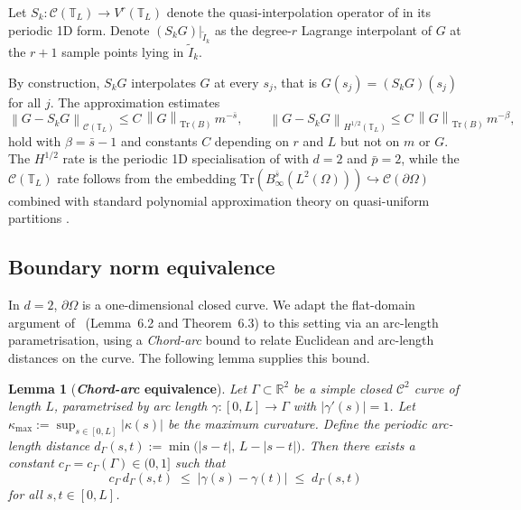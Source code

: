 \documentclass[11pt]{article}
\newtheorem{lemma}[theorem]{Lemma}
\newcommand{\Omg}{\Omega}
\newcommand{\bOmg}{\partial\Omega}
\newcommand{\C}{\mathcal{C}}
\newcommand{\norm}[1]{\left\|#1\right\|}
\newcommand{\R}{\mathbb{R}}
\begin{document}
Let $S_k\colon \C(\mathbb{T}_L) \to V^r(\mathbb{T}_L)$ denote the
quasi-interpolation operator of \cite[\S6.2]{bonito2025} in its
periodic 1D form.  Denote $(S_k G)\big|_{\tilde{I}_k}$ as the degree-$r$
Lagrange interpolant of $G$ at the $r+1$ sample points lying in
$\tilde{I}_k$. 

By construction, $S_k G$ interpolates $G$ at every
$s_j$, that is $G(s_j) = (S_k G)(s_j)$ for all $j$. The approximation
estimates
\begin{equation}\label{eq:quasi_interp}
  \norm{G - S_k G}_{\C(\mathbb{T}_L)}
    \le C\,\norm{G}_{\mathrm{Tr}(B)}\,m^{-\bar{s}},
  \qquad
  \norm{G - S_k G}_{H^{1/2}(\mathbb{T}_L)}
    \le C\,\norm{G}_{\mathrm{Tr}(B)}\,m^{-\beta},
\end{equation}
hold with $\beta = \bar{s} - 1$ and constants $C$ depending on $r$
and $L$ but not on $m$ or $G$. The $H^{1/2}$ rate is the periodic 1D
specialisation of \cite[Theorem~3.2 and~\S A.6.2]{bonito2025} with
$d = 2$ and $\bar{p} = 2$, while the $\C(\mathbb{T}_L)$ rate follows
from the embedding $\mathrm{Tr}(B^{\bar{s}}_\infty(L^2(\Omg)))
\hookrightarrow \C(\partial\Omg)$ combined with standard polynomial
approximation theory on quasi-uniform partitions
\cite{devore1993besov,BrennerScott2008}.

\subsection{Boundary norm equivalence}\label{sec:norm_equiv}

In $d=2$, $\bOmg$ is a one-dimensional closed curve. We adapt the
flat-domain argument of~\cite{bonito2025} (Lemma~6.2 and
Theorem~6.3) to this setting via an arc-length parametrisation,
using a \textit{Chord-arc} bound to relate Euclidean and arc-length
distances on the curve. The following lemma supplies this bound.




\begin{lemma}[\textbf{\textit{Chord-arc} equivalence}]\label{lem:chord_arc}
Let $\Gamma \subset \R^2$ be a simple closed $\C^2$ curve of length $L$,
parametrised by arc length $\gamma\colon [0,L] \to \Gamma$ with
$|\gamma'(s)|=1$. Let $\kappa_{\max} :=
\sup_{s\in[0,L]}|\kappa(s)|$ be the maximum curvature. Define the
periodic arc-length distance $d_\Gamma(s,t) :=
\min\bigl(|s-t|,\,L-|s-t|\bigr)$. Then there exists a constant
$c_\Gamma = c_\Gamma(\Gamma) \in (0,1]$ such that
\begin{equation}\label{eq:chord_arc}
  c_\Gamma\, d_\Gamma(s,t)
  \;\leq\; |\gamma(s) - \gamma(t)|
  \;\leq\; d_\Gamma(s,t)
\end{equation}
for all $s,t \in [0,L]$.
\end{lemma}
\end{document}
